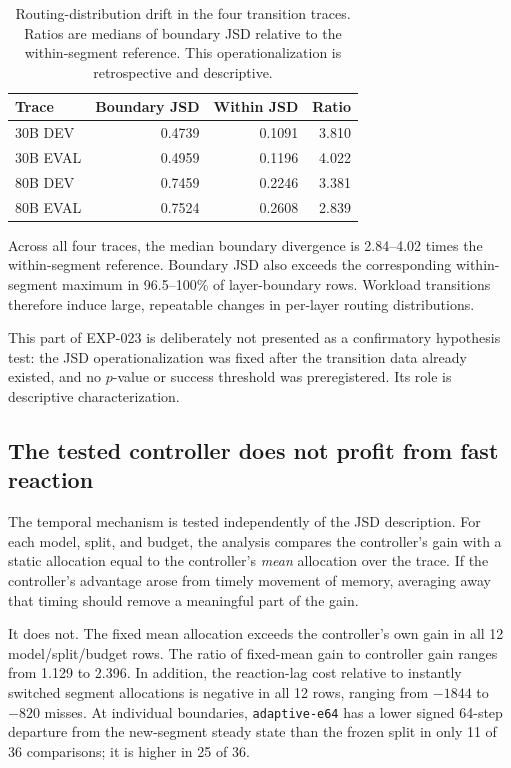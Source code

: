 \begin{table}[t]
    \centering
    \caption{Routing-distribution drift in the four transition traces. Ratios are medians of boundary JSD relative to the within-segment reference. This operationalization is retrospective and descriptive.}
    \label{tab:jsd-drift}
    \small
    \begin{tabular}{lrrr}
        \toprule
        Trace & Boundary JSD & Within JSD & Ratio \\
        \midrule
        30B DEV  & 0.4739 & 0.1091 & 3.810 \\
        30B EVAL & 0.4959 & 0.1196 & 4.022 \\
        80B DEV  & 0.7459 & 0.2246 & 3.381 \\
        80B EVAL & 0.7524 & 0.2608 & 2.839 \\
        \bottomrule
    \end{tabular}
\end{table}

Across all four traces, the median boundary divergence is 2.84--4.02 times the within-segment reference. Boundary JSD also exceeds the corresponding within-segment maximum in 96.5--100\% of layer-boundary rows. Workload transitions therefore induce large, repeatable changes in per-layer routing distributions.

This part of EXP-023 is deliberately not presented as a confirmatory hypothesis test: the JSD operationalization was fixed after the transition data already existed, and no $p$-value or success threshold was preregistered. Its role is descriptive characterization.

\subsection{The tested controller does not profit from fast reaction}

The temporal mechanism is tested independently of the JSD description. For each model, split, and budget, the analysis compares the controller's gain with a static allocation equal to the controller's \emph{mean} allocation over the trace. If the controller's advantage arose from timely movement of memory, averaging away that timing should remove a meaningful part of the gain.

It does not. The fixed mean allocation exceeds the controller's own gain in all 12 model/split/budget rows. The ratio of fixed-mean gain to controller gain ranges from 1.129 to 2.396. In addition, the reaction-lag cost relative to instantly switched segment allocations is negative in all 12 rows, ranging from $-1844$ to $-820$ misses. At individual boundaries, \texttt{adaptive-e64} has a lower signed 64-step departure from the new-segment steady state than the frozen split in only 11 of 36 comparisons; it is higher in 25 of 36.

